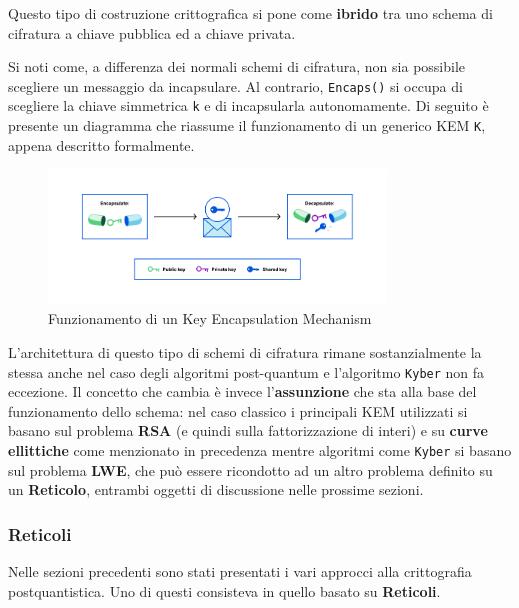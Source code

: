 \documentclass[a4paper, 12pt, oneside]{article}
\theoremstyle{definition}
\begin{document}
Questo tipo di costruzione crittografica si pone come \textbf{ibrido} tra uno schema di cifratura a chiave pubblica ed a chiave privata.

Si noti come, a differenza dei normali schemi di cifratura, non sia possibile scegliere un messaggio da incapsulare. Al contrario, \texttt{Encaps()} si occupa di scegliere la chiave simmetrica \texttt{k} e di incapsularla autonomamente.
\newpage
Di seguito è presente un diagramma che riassume il funzionamento di un generico KEM \texttt{K}, appena descritto formalmente.

\begin{figure}[H]
    \centering
    \includegraphics[width=0.8\textwidth]{images/kem_scheme.png}
    \caption[If you see me then something's very broken]{Funzionamento di un Key Encapsulation Mechanism\protect\footnotemark}
\end{figure}


L'architettura di questo tipo di schemi di cifratura rimane sostanzialmente la stessa anche nel caso degli algoritmi post-quantum e l'algoritmo \texttt{Kyber} non fa eccezione. Il concetto che cambia è invece l'\textbf{assunzione} che sta alla base del funzionamento dello schema: nel caso classico i principali KEM utilizzati si basano sul problema \textbf{RSA} (e quindi sulla fattorizzazione di interi) e su \textbf{curve ellittiche} come menzionato in precedenza mentre algoritmi come \texttt{Kyber} si basano sul problema \textbf{LWE}, che può essere ricondotto ad un altro problema definito su un \textbf{Reticolo}, entrambi oggetti di discussione nelle prossime sezioni.
\newpage
\subsubsection{Reticoli}
Nelle sezioni precedenti sono stati presentati i vari approcci alla crittografia postquantistica. Uno di questi consisteva in quello basato su \textbf{Reticoli}.
\end{document}
